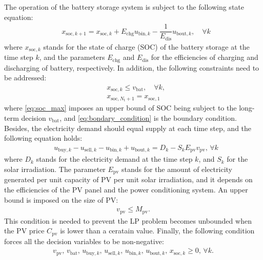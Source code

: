 \documentclass[lettersize,journal]{IEEEtran}
\begin{document}
%
The operation of the battery storage system is subject to the following  state equation: 
\begin{align}
& x_{\mathrm{soc}, k+1} =  x_{\mathrm{soc}, k} + E_\mathrm{chg}  u_{\mathrm{bin},k} - \dfrac{1}{E_\mathrm{dis}} u_{\mathrm{bout},k}, \quad \forall k  
\end{align}
where $x_{\mathrm{soc}, k}$ stands for the state of charge (SOC) of the battery storage at the time step $k$, and the parameters $E_\mathrm{chg}$ and $E_\mathrm{dis}$ for the efficiencies of charging and discharging of battery, respectively. 
In addition, the following constraints need to be addressed: 
\begin{align}
  & x_{\mathrm{soc},k} \le v_\mathrm{bat},  \quad \forall k,  \label{eq:soc_max} \\
  &  x_{\mathrm{soc}, N_\mathrm{t}+1 } = x_{\mathrm{soc}, 1} \label{eq:bondary_condition}
\end{align}
where \eqref{eq:soc_max} imposes an upper bound of SOC being subject to the long-term decision $v_\mathrm{bat}$, and \eqref{eq:bondary_condition}  is the boundary condition.  
Besides, the electricity demand should equal supply at each time step, and the following equation holds:
\begin{align} \label{eq:energy_balance}
  & u_{\mathrm{buy},k} - u_{\mathrm{sell},k}  -  u_{\mathrm{bin},k} + u_{\mathrm{bout},k} = D_k - S_k E_\mathrm{pv} v_\mathrm{pv}, \, \forall k  %
\end{align}
where $D_k$ stands for the electricity demand at the time step $k$, and $S_k$ for the solar irradiation. 
The parameter $E_\mathrm{pv}$ stands for the amount of electricity generated per unit capacity of PV per unit solar irradiation, and it depends on the efficiencies of the PV panel and the power conditioning system.  
An upper bound is imposed on the size of PV: 
\begin{align}
   v_\mathrm{pv} \le M_\mathrm{pv}.
\end{align}
This condition is needed to prevent the LP problem becomes unbounded when the PV price $C_\mathrm{pv}$ is lower than a ceratain value. 
Finally, the following condition forces all the decision variables to be non-negative:
\begin{align}
    v_\mathrm{pv}, \, v_\mathrm{bat}, \, u_{\mathrm{buy},k}, \, u_{\mathrm{sell},k},\, u_{\mathrm{bin},k}, \, u_{\mathrm{bout},k}, \, x_{\mathrm{soc},k}  \ge 0, \, \forall k. 
\end{align}
\end{document}
